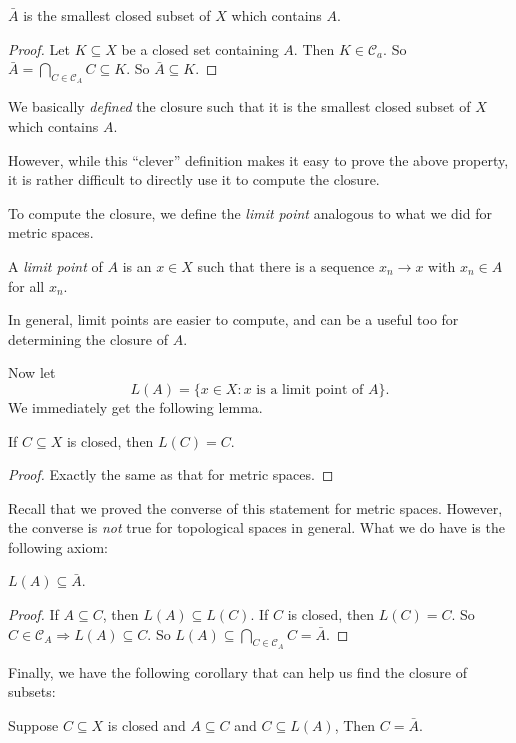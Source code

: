 \documentclass[a4paper]{article}
\begin{document}
\begin{prop}
  $\bar A$ is the smallest closed subset of $X$ which contains $A$.
\end{prop}

\begin{proof}
  Let $K\subseteq X$ be a closed set containing $A$. Then $K\in \mathcal{C}_a$. So $\bar A = \bigcap_{C\in \mathcal{C}_A}C \subseteq K$. So $\bar A\subseteq K$.
\end{proof}

We basically \emph{defined} the closure such that it is the smallest closed subset of $X$ which contains $A$.

However, while this ``clever'' definition makes it easy to prove the above property, it is rather difficult to directly use it to compute the closure.

To compute the closure, we define the \emph{limit point} analogous to what we did for metric spaces.
\begin{defi}
  A \emph{limit point} of $A$ is an $x\in X$ such that there is a sequence $x_n \to x$ with $x_n \in A$ for all $x_n$.
\end{defi}
In general, limit points are easier to compute, and can be a useful too for determining the closure of $A$.

Now let
\[
  L(A) = \{x\in X: x\text{ is a limit point of }A\}.
\]
We immediately get the following lemma.
\begin{lemma}
  If $C\subseteq X$ is closed, then $L(C) = C$.
\end{lemma}

\begin{proof}
  Exactly the same as that for metric spaces.
\end{proof}
Recall that we proved the converse of this statement for metric spaces. However, the converse is \emph{not} true for topological spaces in general. What we do have is the following axiom:

\begin{prop}
  $L(A) \subseteq \bar A$.
\end{prop}

\begin{proof}
  If $A\subseteq C$, then $L(A) \subseteq L(C)$. If $C$ is closed, then $L(C) = C$. So $C\in \mathcal{C}_A \Rightarrow  L(A) \subseteq C$. So $L(A) \subseteq \bigcap_{C\in \mathcal{C}_A}C = \bar A$.
\end{proof}

Finally, we have the following corollary that can help us find the closure of subsets:
\begin{cor}
  Suppose $C\subseteq X$ is closed and $A\subseteq C$ and $C\subseteq L(A)$, Then $C = \bar A$.
\end{cor}
\end{document}
